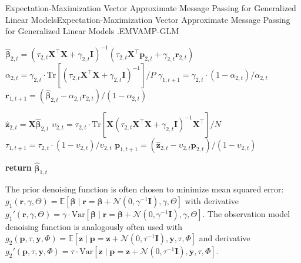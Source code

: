 \begin{breakablealgorithm}{Expectation-Maximization Vector Approximate Message Passing for Generalized Linear Models}{Expectation-Maximization Vector Approximate Message Passing for Generalized Linear Models \cite{schniter_vector_2016,emGVAMP2018}.}{EMVAMP-GLM}
\begin{algorithmic}[1]
            \STATE $\hat{\bm{\beta}}_{2,t} = ( \tau_{2,t} \bm{X}^\top\bm{X} + \gamma_{2,t} \bm{I} )^{-1} ( \tau_{2,t} \bm{X}^\top \bm{p}_{2,t} + \gamma_{2,t} \bm{r}_{2,t} )$
            \STATE $\alpha_{2,t} = \gamma_{2,t} \cdot \mathrm{Tr}[(\tau_{2,t} \bm{X}^\top\bm{X} + \gamma_{2,t}\bm{I})^{-1}] / P$
            \STATE $\gamma_{1,t+1} = \gamma_{2,t} \cdot (1-\alpha_{2,t}) / \alpha_{2,t}$
            \STATE $\bm{r}_{1,t+1} = (\hat{\bm{\beta}}_{2,t} - \alpha_{2,t} \bm{r}_{2,t}) / (1-\alpha_{2,t})$
            \item[]

            \STATE $\hat{\bm{z}}_{2,t} = \bm{X} \hat{\bm{\beta}}_{2,t}$
            \STATE $\upsilon_{2,t} = \tau_{2,t} \cdot \mathrm{Tr}[\bm{X}(\tau_{2,t} \bm{X}^\top\bm{X} + \gamma_{2,t}\bm{I})^{-1}\bm{X}^\top] / N$
            \STATE $\tau_{1,t+1} = \tau_{2,t} \cdot (1-\upsilon_{2,t}) / \upsilon_{2,t}$
            \STATE $\bm{p}_{1,t+1} = (\hat{\bm{z}}_{2,t} - \upsilon_{2,t} \bm{p}_{2,t}) / (1-\upsilon_{2,t})$

        \ENDFOR
        \STATE \textbf{return} $\hat{\bm{\beta}}_{1,t}$
    \end{algorithmic}
\end{breakablealgorithm}

The prior denoising function is often chosen to minimize mean squared error: $g_{1}(\bm{r}, \gamma, \Theta) = \mathbb{E}[\bm{\beta} \mid \bm{r} = \bm{\beta} + \mathcal{N}(0, \gamma^{-1}\bm{I}), \gamma, \Theta]$ with derivative $g_{1}'(\bm{r}, \gamma, \Theta) = \gamma \cdot \mathrm{Var}[\bm{\beta} \mid \bm{r} = \bm{\beta} + \mathcal{N}(0, \gamma^{-1}\bm{I}), \gamma, \Theta]$. The observation model denoising function is analogously often used with $g_{2}(\bm{p}, \tau, \mathbf{y}, \Phi) = \mathbb{E}[\bm{z} \mid \bm{p} = \bm{z} + \mathcal{N}(0, \tau^{-1}\bm{I}), \mathbf{y}, \tau, \Phi]$ and derivative $g_{2}'(\bm{p}, \tau, \mathbf{y}, \Phi) =  \tau \cdot \mathrm{Var}[\bm{z} \mid \bm{p} = \bm{z} + \mathcal{N}(0, \tau^{-1}\bm{I}), \mathbf{y}, \tau, \Phi]$.
